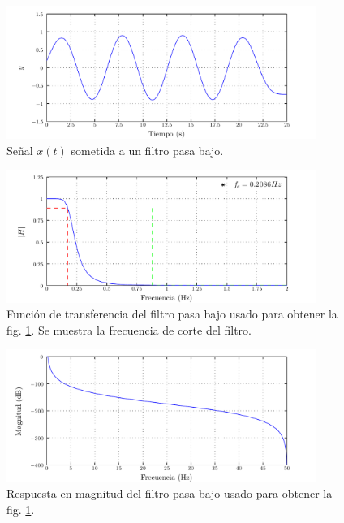 \documentclass[a4paper,12pt,final]{article}
\begin{document}
    \begin{figure}[H]
      \begin{center}
        \caption{Señal $x\left(t\right)$ sometida a un filtro pasa bajo.}
        \label{p1f3}
        \vspace{-1em}
        \includegraphics[width=0.9\textwidth]{./laboratorio_5/problema01_lowpass_filtered_signal.pdf}
      \end{center}
    \end{figure}

    \begin{figure}[H]
      \begin{center}
        \caption{Función de transferencia del filtro pasa bajo usado para obtener la fig. \ref{p1f3}. Se muestra la frecuencia de corte del filtro.}
        \label{p1f4}
        \vspace{-1em}
        \includegraphics[width=0.9\textwidth]{./laboratorio_5/problema01_lowpass_transfer_function.pdf}
      \end{center}
    \end{figure}

    \begin{figure}[H]
      \begin{center}
        \caption{Respuesta en magnitud del filtro pasa bajo usado para obtener la fig. \ref{p1f3}.}
        \label{p1f5}
        \vspace{-1em}
        \includegraphics[width=0.9\textwidth]{./laboratorio_5/problema01_lowpass_filter_magnitude.pdf}
      \end{center}
    \end{figure}
\end{document}
